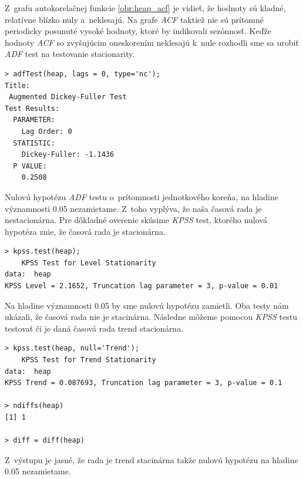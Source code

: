 \documentclass[12pt,a4paper,oneside,final]{article}
\theoremstyle{definition}
\theoremstyle{remark}
\numberwithin{equation}{section}
\begin{document}
Z~grafu autokorelačnej funkcie \ref{obr:heap_acf} je vidieť, že hodnoty sú kladné,
relatívne blízko nuly a~neklesajú. 
Na grafe \emph{ACF} taktiež nie sú prítomné periodicky posunuté vysoké hodnoty, 
ktoré by indikovali sezónnosť.
Keďže hodnoty \emph{ACF} so zvyšujúcim oneskorením neklesajú k~nule rozhodli sme sa urobiť
\emph{ADF} test na testovanie stacionarity.

\begin{minipage}{\linewidth}
\begingroup
\fontsize{9pt}{7pt}\selectfont  %
\begin{verbatim}
> adfTest(heap, lags = 0, type='nc');
Title:
 Augmented Dickey-Fuller Test
Test Results:
  PARAMETER:
    Lag Order: 0
  STATISTIC:
    Dickey-Fuller: -1.1436
  P VALUE:
    0.2508 
\end{verbatim}
\endgroup
\end{minipage}

Nulovú hypotézu \emph{ADF} testu o~prítomnosti jednotkového koreňa, na hladine významnosti 0.05
nezamietame. Z~toho vyplýva, že naša časová rada je nestacionárna. Pre dôkladné 
overenie skúsime \emph{KPSS} test, ktorého nulová hypotéza znie, že časová rada je stacionárna.

\begin{minipage}{\linewidth}
\begingroup
\fontsize{9pt}{7pt}\selectfont %
\begin{verbatim}
> kpss.test(heap);
	KPSS Test for Level Stationarity
data:  heap
KPSS Level = 2.1652, Truncation lag parameter = 3, p-value = 0.01
\end{verbatim}
\endgroup
\end{minipage}

Na hladine významnosti 0.05 by sme nulovú hypotézu zamietli. Oba testy nám ukázali, že časová
rada nie je stacinárna. 
Následne môžeme pomocou \emph{KPSS} testu testovať či je daná časová rada trend stacionárna.

\begin{minipage}{\linewidth}
\begingroup
\fontsize{9pt}{7pt}\selectfont %
\begin{verbatim}
> kpss.test(heap, null='Trend');
	KPSS Test for Trend Stationarity
data:  heap
KPSS Trend = 0.087693, Truncation lag parameter = 3, p-value = 0.1

> ndiffs(heap)
[1] 1

> diff = diff(heap)
\end{verbatim}
\endgroup
\end{minipage}

Z~výstupu je jasné, že rada je trend stacinárna takže nulovú hypotézu na hladine 0.05
nezamietame.
\end{document}
